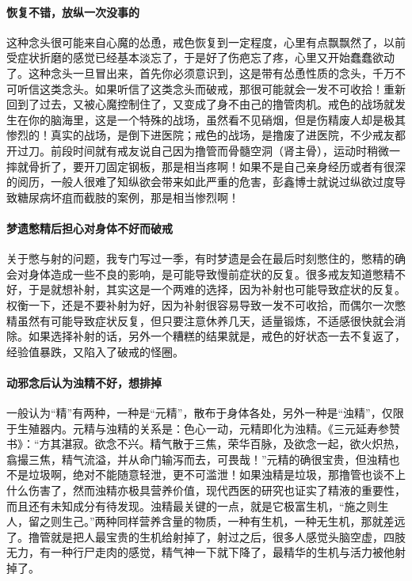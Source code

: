 \paragraph{恢复不错，放纵一次没事的}

这种念头很可能来自心魔的怂恿，戒色恢复到一定程度，心里有点飘飘然了，以前受症状折磨的感觉已经基本淡忘了，于是好了伤疤忘了疼，心里又开始蠢蠢欲动了。这种念头一旦冒出来，首先你必须意识到，这是带有怂恿性质的念头，千万不可听信这类念头。如果听信了这类念头而破戒，那很可能就会一发不可收拾！重新回到了过去，又被心魔控制住了，又变成了身不由己的撸管肉机。戒色的战场就发生在你的脑海里，这是一个特殊的战场，虽然看不见硝烟，但是伤精废人却是极其惨烈的！真实的战场，是倒下进医院；戒色的战场，是撸废了进医院，不少戒友都开过刀。前段时间就有戒友说自己因为撸管而骨髓空洞（肾主骨），运动时稍微一摔就骨折了，要开刀固定钢板，那是相当疼啊！如果不是自己亲身经历或者有很深的阅历，一般人很难了知纵欲会带来如此严重的危害，彭鑫博士就说过纵欲过度导致糖尿病坏疽而截肢的案例，那是相当惨烈啊！

\paragraph{梦遗憋精后担心对身体不好而破戒}

关于憋与射的问题，我专门写过一季，有时梦遗是会在最后时刻憋住的，憋精的确会对身体造成一些不良的影响，是可能导致慢前症状的反复。很多戒友知道憋精不好，于是就想补射，其实这是一个两难的选择，因为补射也可能导致症状的反复。权衡一下，还是不要补射为好，因为补射很容易导致一发不可收拾，而偶尔一次憋精虽然有可能导致症状反复，但只要注意休养几天，适量锻炼，不适感很快就会消除。如果选择补射的话，另外一个糟糕的结果就是，戒色的好状态一去不复返了，经验值暴跌，又陷入了破戒的怪圈。

\paragraph{动邪念后认为浊精不好，想排掉}

一般认为“精”有两种，一种是“元精”，散布于身体各处，另外一种是“浊精”，仅限于生殖器内。元精与浊精的关系是：色心一动，元精即化为浊精。《三元延寿参赞书》：“方其湛寂。欲念不兴。精气散于三焦，荣华百脉，及欲念一起，欲火炽热，翕撮三焦，精气流溢，并从命门输泻而去，可畏哉！”元精的确很宝贵，但浊精也不是垃圾啊，绝对不能随意轻泄，更不可滥泄！如果浊精是垃圾，那撸管也谈不上什么伤害了，然而浊精亦极具营养价值，现代西医的研究也证实了精液的重要性，而且还有未知成分有待发现。浊精最关键的一点，就是它极富生机，“施之则生人，留之则生己。”两种同样营养含量的物质，一种有生机，一种无生机，那就差远了。撸管就是把人最宝贵的生机给射掉了，射过之后，很多人感觉头脑空虚，四肢无力，有一种行尸走肉的感觉，精气神一下就下降了，最精华的生机与活力被他射掉了。

